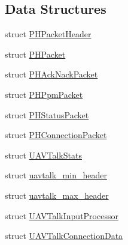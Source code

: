 \subsection*{Data Structures}
\begin{DoxyCompactItemize}
\item 
struct \hyperlink{struct_p_h_packet_header}{P\-H\-Packet\-Header}
\item 
struct \hyperlink{struct_p_h_packet}{P\-H\-Packet}
\item 
struct \hyperlink{struct_p_h_ack_nack_packet}{P\-H\-Ack\-Nack\-Packet}
\item 
struct \hyperlink{struct_p_h_ppm_packet}{P\-H\-Ppm\-Packet}
\item 
struct \hyperlink{struct_p_h_status_packet}{P\-H\-Status\-Packet}
\item 
struct \hyperlink{struct_p_h_connection_packet}{P\-H\-Connection\-Packet}
\item 
struct \hyperlink{struct_u_a_v_talk_stats}{U\-A\-V\-Talk\-Stats}
\item 
struct \hyperlink{structuavtalk__min__header}{uavtalk\-\_\-min\-\_\-header}
\item 
struct \hyperlink{structuavtalk__max__header}{uavtalk\-\_\-max\-\_\-header}
\item 
struct \hyperlink{struct_u_a_v_talk_input_processor}{U\-A\-V\-Talk\-Input\-Processor}
\item 
struct \hyperlink{struct_u_a_v_talk_connection_data}{U\-A\-V\-Talk\-Connection\-Data}
\end{DoxyCompactItemize}

